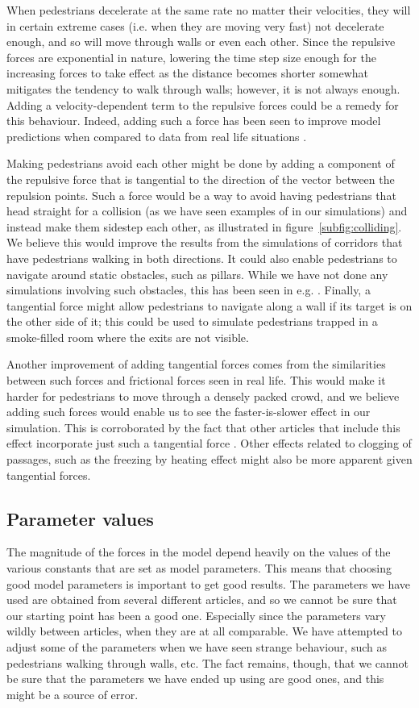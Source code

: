When pedestrians decelerate at the same rate no matter their velocities, they 
will in certain extreme cases (i.e. when they are moving very fast) not 
decelerate enough, and so will move through walls or even each other. Since 
the repulsive forces are exponential in nature, lowering the time step size 
enough for the increasing forces to take effect as the distance becomes 
shorter somewhat mitigates the tendency to walk through walls; however, it is 
not always enough. Adding a velocity-dependent term to the repulsive forces 
could be a remedy for this behaviour. Indeed, adding such a force has been 
seen to improve model predictions when compared to data from real life 
situations \cite{ABconstant}.

Making pedestrians avoid each other might be done by adding a component of the 
repulsive force that is tangential to the direction of the vector between the 
repulsion points. Such a force would be a way to avoid having pedestrians that 
head straight for a collision (as we have seen examples of in our simulations) 
and instead make them sidestep each other, as illustrated in 
figure~\ref{subfig:colliding}. We believe this would improve the results from 
the simulations of corridors that have pedestrians walking in both directions. 
It could also enable pedestrians to navigate around static obstacles, such as 
pillars. While we have not done any simulations involving such obstacles, this 
has been seen in e.g. \cite{tang}. Finally, a tangential force might allow 
pedestrians to navigate along a wall if its target is on the other side of it; 
this could be used to simulate pedestrians trapped in a smoke-filled room 
where the exits are not visible.

Another improvement of adding tangential forces comes from the similarities 
between such forces and frictional forces seen in real life. This would make 
it harder for pedestrians to move through a densely packed crowd, and we 
believe adding such forces would enable us to see the faster-is-slower effect 
in our simulation. This is corroborated by the fact that other articles that 
include this effect incorporate just such a tangential force \cite{self-org}. 
Other effects related to clogging of passages, such as the freezing by heating 
effect might also be more apparent given tangential forces.


\subsection{Parameter values}
The magnitude of the forces in the model depend heavily on the values of the 
various constants that are set as model parameters. This means that choosing 
good model parameters is important to get good results. The parameters we have 
used are obtained from several different articles, and so we cannot be sure 
that our starting point has been a good one. Especially since the parameters 
vary wildly between articles, when they are at all comparable. We have 
attempted to adjust some of the parameters when we have seen strange 
behaviour, such as pedestrians walking through walls, etc. The fact remains, 
though, that we cannot be sure that the parameters we have ended up using are 
good ones, and this might be a source of error.

